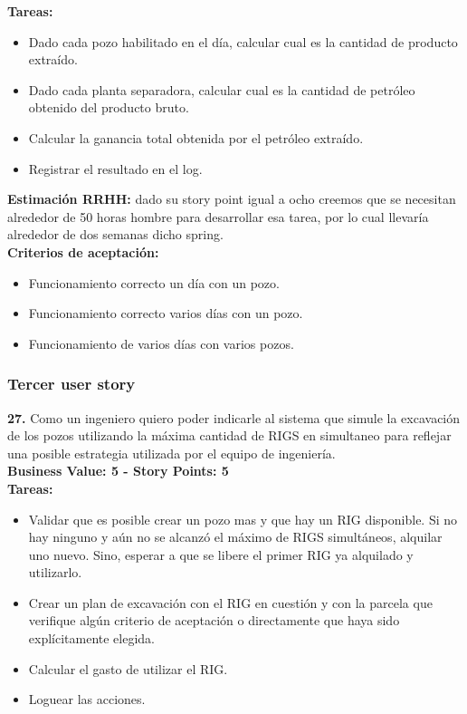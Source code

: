 \textbf{Tareas:}

\begin{itemize}
    \item Dado cada pozo habilitado en el día, calcular cual es la cantidad de producto extraído.
    \item Dado cada planta separadora, calcular cual es la cantidad de petróleo obtenido del producto bruto.
    \item Calcular la ganancia total obtenida por el petróleo extraído.
    \item Registrar el resultado en el log.
\end{itemize}

\textbf{Estimaci\'on RRHH:}
dado su story point igual a ocho creemos que se necesitan alrededor de 50 horas hombre para desarrollar esa tarea, por lo cual llevar\'ia alrededor de dos semanas dicho spring.\\

\textbf{Criterios de aceptaci\'on:}
\begin{itemize}
    \item Funcionamiento correcto un d\'ia con un pozo.
    \item Funcionamiento correcto varios d\'ias con un pozo.
    \item Funcionamiento de varios d\'ias con varios pozos.
\end{itemize}

\subsubsection{Tercer user story}

\textbf{27.} Como un ingeniero quiero poder indicarle al sistema que simule la excavación de los pozos utilizando la máxima cantidad de RIGS en simultaneo para reflejar una posible estrategia utilizada por el equipo de ingeniería.\\
\textbf{Business Value: 5 - Story Points: 5}\\

\textbf{Tareas:}

\begin{itemize}
    \item Validar que es posible crear un pozo mas y que hay un RIG disponible. Si no hay ninguno y aún no se alcanzó el máximo de RIGS simultáneos, alquilar uno nuevo. Sino, esperar a que se libere el primer RIG ya alquilado y utilizarlo.
    \item Crear un plan de excavación con el RIG en cuestión y con la parcela que verifique algún criterio de aceptación o directamente que haya sido explícitamente elegida.
    \item Calcular el gasto de utilizar el RIG.
    \item Loguear las acciones.
\end{itemize}

